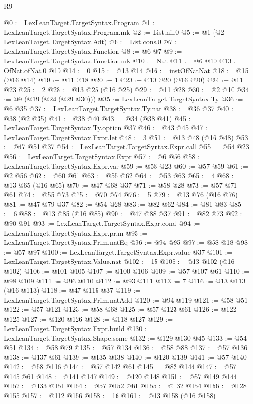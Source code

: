 \begin{lexlean}{R9}
\begin{coremodule}
@0 := LexLeanTarget.TargetSyntax.Program
@1 := LexLeanTarget.TargetSyntax.Program.mk
@2 := List.nil.{0}
@5 := @1 (@2 LexLeanTarget.TargetSyntax.Adt)
@6 := List.cons.{0}
@7 := LexLeanTarget.TargetSyntax.Function
@8 := @6 @7
@9 := LexLeanTarget.TargetSyntax.Function.mk
@10 := Nat
@11 := @6 @10
@13 := OfNat.ofNat.{0} @10
@14 := 0
@15 := @13 @14
@16 := instOfNatNat
@18 := @15 (@16 @14)
@19 := @11 @18
@20 := 1
@23 := @13 @20 (@16 @20)
@24 := @11 @23
@25 := 2
@28 := @13 @25 (@16 @25)
@29 := @11 @28
@30 := @2 @10
@34 := @9 (@19 (@24 (@29 @30)))
@35 := LexLeanTarget.TargetSyntax.Ty
@36 := @6 @35
@37 := LexLeanTarget.TargetSyntax.Ty.nat
@38 := @36 @37
@40 := @38 (@2 @35)
@41 := @38 @40
@43 := @34 (@38 @41)
@45 := LexLeanTarget.TargetSyntax.Ty.option @37
@46 := @43 @45
@47 := LexLeanTarget.TargetSyntax.Expr.let
@48 := 3
@51 := @13 @48 (@16 @48)
@53 := @47 @51 @37
@54 := LexLeanTarget.TargetSyntax.Expr.call
@55 := @54 @23
@56 := LexLeanTarget.TargetSyntax.Expr
@57 := @6 @56
@58 := LexLeanTarget.TargetSyntax.Expr.var
@59 := @58 @23
@60 := @57 @59
@61 := @2 @56
@62 := @60 @61
@63 := @55 @62
@64 := @53 @63
@65 := 4
@68 := @13 @65 (@16 @65)
@70 := @47 @68 @37
@71 := @58 @28
@73 := @57 @71 @61
@74 := @55 @73
@75 := @70 @74
@76 := 5
@79 := @13 @76 (@16 @76)
@81 := @47 @79 @37
@82 := @54 @28
@83 := @82 @62
@84 := @81 @83
@85 := 6
@88 := @13 @85 (@16 @85)
@90 := @47 @88 @37
@91 := @82 @73
@92 := @90 @91
@93 := LexLeanTarget.TargetSyntax.Expr.cond
@94 := LexLeanTarget.TargetSyntax.Expr.prim
@95 := LexLeanTarget.TargetSyntax.Prim.natEq
@96 := @94 @95
@97 := @58 @18
@98 := @57 @97
@100 := LexLeanTarget.TargetSyntax.Expr.value @37
@101 := LexLeanTarget.TargetSyntax.Value.nat
@102 := 15
@105 := @13 @102 (@16 @102)
@106 := @101 @105
@107 := @100 @106
@109 := @57 @107 @61
@110 := @98 @109
@111 := @96 @110
@112 := @93 @111
@113 := 7
@116 := @13 @113 (@16 @113)
@118 := @47 @116 @37
@119 := LexLeanTarget.TargetSyntax.Prim.natAdd
@120 := @94 @119
@121 := @58 @51
@122 := @57 @121
@123 := @58 @68
@125 := @57 @123 @61
@126 := @122 @125
@127 := @120 @126
@128 := @118 @127
@129 := LexLeanTarget.TargetSyntax.Expr.build
@130 := LexLeanTarget.TargetSyntax.Shape.some
@132 := @129 @130 @45
@133 := @54 @51
@134 := @58 @79
@135 := @57 @134
@136 := @58 @88
@137 := @57 @136
@138 := @137 @61
@139 := @135 @138
@140 := @120 @139
@141 := @57 @140
@142 := @58 @116
@144 := @57 @142 @61
@145 := @82 @144
@147 := @57 @145 @61
@148 := @141 @147
@149 := @120 @148
@151 := @57 @149 @144
@152 := @133 @151
@154 := @57 @152 @61
@155 := @132 @154
@156 := @128 @155
@157 := @112 @156
@158 := 16
@161 := @13 @158 (@16 @158)

\end{coremodule}
\end{lexlean}
